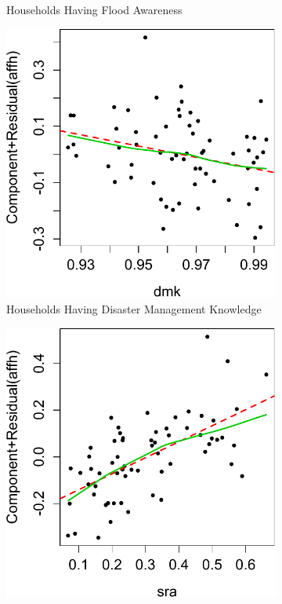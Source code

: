 \documentclass[preprint,review,12pt]{elsarticle}
\begin{document}
\begin{figure}[!htp]
\begin{subfigure}[t]{0.23\textwidth}
\caption{Households Having Flood Awareness}
\end{subfigure}\hspace{5mm}
\begin{subfigure}[t]{0.23\textwidth}
\centering
\includegraphics[width=\linewidth, keepaspectratio]{dmk.pdf}
\caption{Households Having Disaster Management Knowledge}
\end{subfigure}
\begin{subfigure}[t]{0.23\textwidth}
\centering
\includegraphics[width=\linewidth, keepaspectratio]{sra.pdf}

\end{subfigure}
\end{figure}
\end{document}
